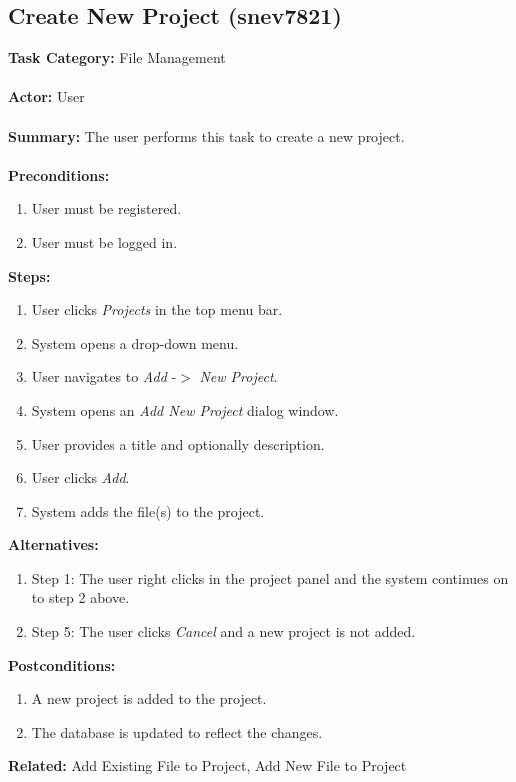 \documentclass[11pt]{report}
\begin{document}
\subsection{Create New Project (snev7821)}
\begin{framed}

	\textbf{Task Category:} File Management \\ \\
	\textbf{Actor:} User \\ \\
	\textbf{Summary:} The user performs this task to create a new project. \\ \\
	\textbf{Preconditions:} 
	\begin{enumerate}
		\item User must be registered.
		\item User must be logged in.
	\end{enumerate}
	\textbf{Steps:}
	\begin{enumerate}
		\item User clicks \textit{Projects} in the top menu bar.
		\item System opens a drop-down menu.
		\item User navigates to \textit{Add} -$>$ \textit{New Project}.
		\item System opens an \textit{Add New Project} dialog window.
		\item User provides a title and optionally description.
		\item User clicks \textit{Add}.
		\item System adds the file(s) to the project.
	\end{enumerate}
	\textbf{Alternatives:} 
	\begin{enumerate}
		\item Step 1: The user right clicks in the project panel and the system continues on to step 2 above.
		\item Step 5: The user clicks \textit{Cancel} and a new project is not added.
	\end{enumerate}
	\textbf{Postconditions:}
	\begin{enumerate}
		\item A new project is added to the project.
		\item The database is updated to reflect the changes.
	\end{enumerate}
	\textbf{Related:} Add Existing File to Project, Add New File to Project
\end{framed} 
\end{document}

